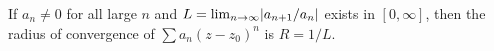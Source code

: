 \begin{theorem}\label{thm:ratio-test}
  If $a_n \neq 0$ for all large $n$ and
  $L = \lim_{n \to \infty} \lvert a_{n+1}/a_n\rvert$ exists in $[0, \infty]$, then the
  radius of convergence of $\sum a_n (z - z_0)^n$ is $R = 1/L$.
\end{theorem}
